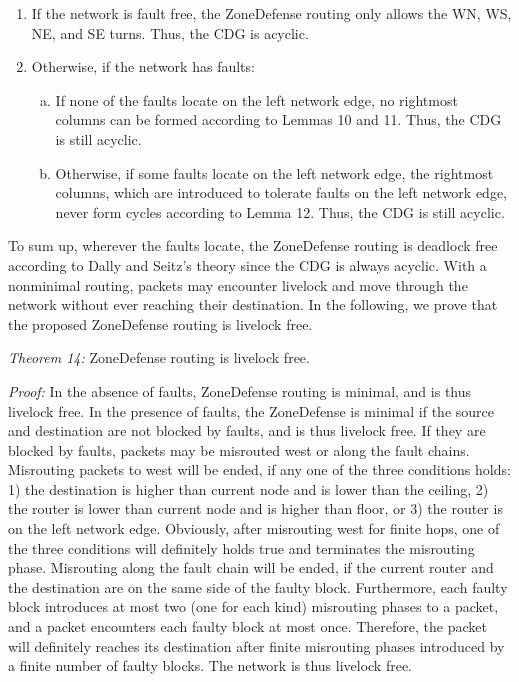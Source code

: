 \begin{enumerate}[1)]
    \item If the network is fault free, the ZoneDefense routing only allows the WN, WS, NE, and SE turns. Thus, the CDG is acyclic.
    \item Otherwise, if the network has faults: 
        \begin{enumerate}[a)]
            \item If none of the faults locate on the left network edge, no rightmost columns can be formed according to Lemmas 10 and 11. Thus, the CDG is still acyclic.
            \item Otherwise, if some faults locate on the left network edge, the rightmost columns, which are introduced to tolerate faults on the left network edge, never form cycles according to Lemma 12. Thus, the CDG is still acyclic.
        \end{enumerate}
\end{enumerate}

To sum up, wherever the faults locate, the ZoneDefense routing is deadlock free according to Dally and Seitz’s theory \cite{dally1988deadlock} since the CDG is always acyclic. With a nonminimal routing, packets may encounter livelock and move through the network without ever reaching their destination. In the following, we prove that the proposed ZoneDefense routing is livelock free.

\textit{Theorem 14:} ZoneDefense routing is livelock free.

\textit{Proof:} In the absence of faults, ZoneDefense routing is minimal, and is thus livelock free. In the presence of faults, the ZoneDefense is minimal if the source and destination are not blocked by faults, and is thus livelock free. If they are blocked by faults, packets may be misrouted west or along the fault chains. Misrouting packets to west will be ended, if any one of the three conditions holds: 1) the destination is higher than current node and is lower than the ceiling, 2) the router is lower than current node and is higher than floor, or 3) the router is on the left network edge. Obviously, after misrouting west for finite hops, one of the three conditions will definitely holds true and terminates the misrouting phase. Misrouting along the fault chain will be ended, if the current router and the destination are on the same side of the faulty block. Furthermore, each faulty block introduces at most two (one for each kind) misrouting phases to a packet, and a packet encounters each faulty block at most once. Therefore, the packet will definitely reaches its destination after finite misrouting phases introduced by a finite number of faulty blocks. The network is thus livelock free.


